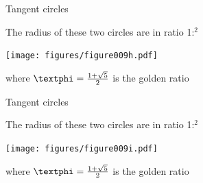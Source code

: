 \documentclass[14pt]{beamer}
\begin{document}

    \begin{frame}{Tangent circles}
        \begin{center}
            The radius of these two circles are in ratio 1:\textphi$^2$
        \end{center}\medskip
        \hspace{6.18em} \texttt{[image: figures/figure009h.pdf]} \\
        \begin{center}
             where $\text{\textphi} =\tfrac{1+\sqrt{5}}{2}$ is the golden ratio
        \end{center}
    \end{frame}


    \begin{frame}{Tangent circles}
        \begin{center}
            The radius of these two circles are in ratio 1:\textphi$^2$
        \end{center}\medskip
        \hspace{6.18em} \texttt{[image: figures/figure009i.pdf]} \\
        \begin{center}
             where $\text{\textphi} =\tfrac{1+\sqrt{5}}{2}$ is the golden ratio
        \end{center}
    \end{frame}

\end{document}
